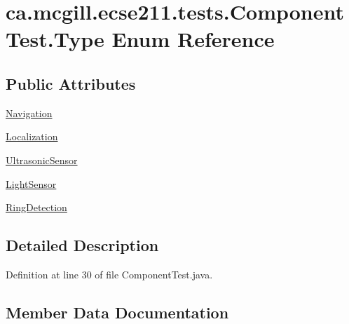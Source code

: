 \hypertarget{enumca_1_1mcgill_1_1ecse211_1_1tests_1_1_component_test_1_1_type}{}\section{ca.\+mcgill.\+ecse211.\+tests.\+Component\+Test.\+Type Enum Reference}
\label{enumca_1_1mcgill_1_1ecse211_1_1tests_1_1_component_test_1_1_type}
\subsection*{Public Attributes}
\begin{DoxyCompactItemize}
\item 
\hyperlink{enumca_1_1mcgill_1_1ecse211_1_1tests_1_1_component_test_1_1_type_a70ec62ab2b745dd99e291459279910ea}{Navigation}
\item 
\hyperlink{enumca_1_1mcgill_1_1ecse211_1_1tests_1_1_component_test_1_1_type_acdc93de9366f2e6710c7f2fc0e4478c3}{Localization}
\item 
\hyperlink{enumca_1_1mcgill_1_1ecse211_1_1tests_1_1_component_test_1_1_type_acb88d74b8bd35b190f8b1b05730c213a}{Ultrasonic\+Sensor}
\item 
\hyperlink{enumca_1_1mcgill_1_1ecse211_1_1tests_1_1_component_test_1_1_type_aa8c9262ad5014cd52ecce2eec6604510}{Light\+Sensor}
\item 
\hyperlink{enumca_1_1mcgill_1_1ecse211_1_1tests_1_1_component_test_1_1_type_ab118eac94e0b37e6871a4c9a788c675e}{Ring\+Detection}
\end{DoxyCompactItemize}


\subsection{Detailed Description}


Definition at line 30 of file Component\+Test.\+java.



\subsection{Member Data Documentation}
\mbox{\label{enumca_1_1mcgill_1_1ecse211_1_1tests_1_1_component_test_1_1_type_aa8c9262ad5014cd52ecce2eec6604510}} 
